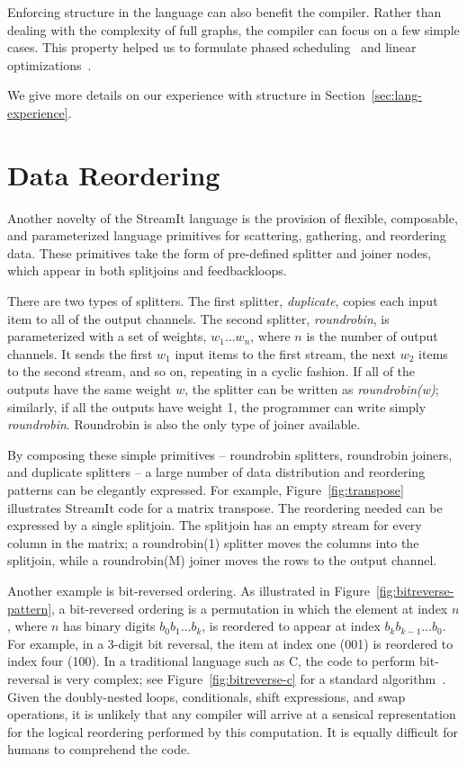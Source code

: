 Enforcing structure in the language can also benefit the compiler.
Rather than dealing with the complexity of full graphs, the compiler
can focus on a few simple cases.  This property helped us to formulate
phased scheduling~\cite{karczmarek-lctes03,karczma-thesis} and
linear
optimizations~\cite{lamb-pldi03,lamb-thesis,agrawal-cases05,agrawal-thesis}.

We give more details on our experience with structure in Section~\ref{sec:lang-experience}.

\section{Data Reordering}

Another novelty of the StreamIt language is the provision of flexible,
composable, and parameterized language primitives for scattering,
gathering, and reordering data.  These primitives take the form of
pre-defined splitter and joiner nodes, which appear in both splitjoins
and feedbackloops.

There are two types of splitters.  The first splitter, {\it
  duplicate}, copies each input item to all of the output channels.
The second splitter, {\it roundrobin}, is parameterized with a set of
weights, $w_1 \dots w_n$, where $n$ is the number of output channels.
It sends the first $w_1$ input items to the first stream, the next
$w_2$ items to the second stream, and so on, repeating in a cyclic
fashion.  If all of the outputs have the same weight $w$, the splitter
can be written as {\it roundrobin(w)}; similarly, if all the outputs
have weight 1, the programmer can write simply {\it roundrobin}.
Roundrobin is also the only type of joiner available.

By composing these simple primitives -- roundrobin splitters,
roundrobin joiners, and duplicate splitters -- a large number of data
distribution and reordering patterns can be elegantly expressed.  For
example, Figure~\ref{fig:transpose} illustrates StreamIt code for a
matrix transpose.  The reordering needed can be expressed by a single
splitjoin.  The splitjoin has an empty stream for every column in the
matrix; a roundrobin(1) splitter moves the columns into the splitjoin,
while a roundrobin(M) joiner moves the rows to the output channel.

Another example is bit-reversed ordering.  As illustrated in
Figure~\ref{fig:bitreverse-pattern}, a bit-reversed ordering is a
permutation in which the element at index $n$, where $n$ has binary
digits $b_0b_1 \dots b_k$, is reordered to appear at index $b_kb_{k-1}
\dots b_0$.  For example, in a 3-digit bit reversal, the item at index
one (001) is reordered to index four (100).  In a traditional language
such as C, the code to perform bit-reversal is very complex; see
Figure~\ref{fig:bitreverse-c} for a standard
algorithm~\cite{press_numerical_1992}.  Given the doubly-nested loops,
conditionals, shift expressions, and swap operations, it is unlikely
that any compiler will arrive at a sensical representation for the
logical reordering performed by this computation.  It is equally
difficult for humans to comprehend the code.

